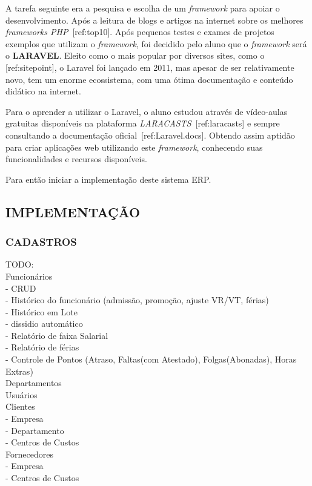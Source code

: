 \documentclass[
  12pt,				%
  openany,
  oneside,
  a4paper,			%
  english,			%
  brazil
]{article}
\numberwithin{figure}{section}
\numberwithin{table}{section}
\begin{document}
A tarefa seguinte era a pesquisa e escolha de um \textit{framework} para apoiar o desenvolvimento. Após a leitura de blogs e artigos na internet sobre os melhores \textit{frameworks PHP}~[ref:top10]. Após pequenos testes e exames de projetos exemplos que utilizam o \textit{framework}, foi decidido pelo aluno que o \textit{framework} será o \textbf{LARAVEL}. Eleito como o mais popular por diversos sites, como o [ref:sitepoint], o Laravel foi lançado em 2011, mas apesar de ser relativamente novo, tem um enorme ecossistema, com uma ótima documentação e conteúdo didático na internet.

Para o aprender a utilizar o Laravel, o aluno estudou através de vídeo-aulas gratuitas disponíveis na plataforma \textit{LARACASTS}~[ref:laracasts] e sempre consultando a documentação oficial~[ref:Laravel.docs]. Obtendo assim aptidão para criar aplicações web utilizando este \textit{framework}, conhecendo suas funcionalidades e recursos disponíveis.

Para então iniciar a implementação deste sistema ERP.




\subsection{IMPLEMENTAÇÃO}



  \subsubsection{CADASTROS}
  
  \noindent TODO: \\
  Funcionários \\
  - CRUD \\
  - Histórico do funcionário (admissão, promoção, ajuste VR/VT, férias)\\
  - Histórico em Lote\\
  - dissidio automático \\
  - Relatório de faixa Salarial \\
  - Relatório de férias \\
  - Controle de Pontos (Atraso, Faltas(com Atestado), Folgas(Abonadas), Horas Extras) \\
  Departamentos \\
  Usuários \\
  Clientes \\
  - Empresa \\
  - Departamento \\
  - Centros de Custos \\
  Fornecedores \\
  - Empresa \\
  - Centros de Custos 
\end{document}
